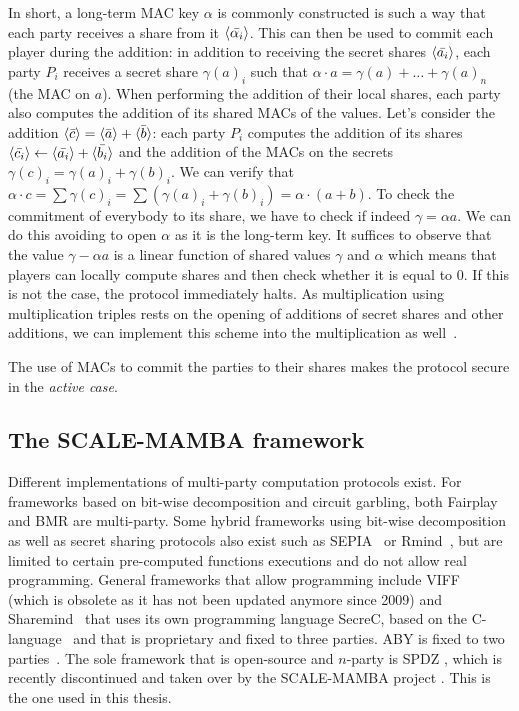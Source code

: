 In short, a long-term MAC key $\alpha$ is commonly constructed is such a way that each party receives a share from it $\langle \bar{\alpha_i} \rangle$. This can then be used to commit each player during the addition: in addition to receiving the secret shares $\langle \bar{a_i} \rangle$, each party $P_i$ receives a secret share $\gamma(a)_i$ such that $\alpha \cdot a = \gamma(a) + \ldots + \gamma(a)_n$ (the MAC on $a$). When performing the addition of their local shares, each party also computes the addition of its shared MACs of the values. Let's consider the addition $\langle \bar{c} \rangle = \langle \bar{a} \rangle + \langle \bar{b} \rangle$: each party $P_i$ computes the addition of its shares $\langle \bar{c_i} \rangle \leftarrow \langle \bar{a_i} \rangle + \langle \bar{b_i} \rangle$ and the addition of the MACs on the secrets $\gamma(c)_i = \gamma(a)_i + \gamma(b)_i$. We can verify that $\alpha \cdot c = \sum \gamma(c)_i = \sum(\gamma(a)_i + \gamma(b)_i) = \alpha \cdot (a + b)$. To check the commitment of everybody to its share, we have to check if indeed $\gamma= \alpha a$. We can do this avoiding to open $\alpha$ as it is the long-term key. It suffices to observe that the value $\gamma - \alpha a$ is a linear function of shared values $\gamma$ and $\alpha$ which means that players can locally compute shares and then check whether it is equal to 0. If this is not the case, the protocol immediately halts. As multiplication using multiplication triples rests on the opening of additions of secret shares and other additions, we can implement this scheme into the multiplication as well~\cite{Damgard2012PracticalLimits.}.

The use of MACs to commit the parties to their shares makes the protocol secure in the \emph{active case}.

\subsection{The SCALE-MAMBA framework}
Different implementations of multi-party computation protocols exist. For frameworks based on bit-wise decomposition and circuit garbling, both Fairplay \cite{Malkhi2004FairplaySystem} and BMR \cite{Beaver1990TheProtocols} are multi-party. Some hybrid frameworks using bit-wise decomposition as well as secret sharing protocols also exist such as SEPIA~\cite{Burkhart2010SEPIA:Statistics} or Rmind~\cite{Bogdanov2018Rmind:Analysis}, but are limited to certain pre-computed functions executions and do not allow real programming. General frameworks that allow programming include VIFF~\cite{Damgard2009AsynchronousImplementation} (which is obsolete as it has not been updated anymore since 2009) and Sharemind~\cite{Bogdanov2008Sharemind:Computations,Bogdanov2013Sharemind:Applications} that uses its own programming language SecreC, based on the C-language~\cite{Ristioja2010AnLanguage,Jagomagis2010SecreCMining,Bogdanov2014Domain-PolymorphicOf} and that is proprietary and fixed to three parties. ABY is fixed to two parties~\cite{Demmler2015ABYComputation}. The sole framework that is open-source and $n$-party is SPDZ \cite{Damgard2012MultipartyEncryption,Damgard2012PracticalLimits.}, which is recently discontinued and taken over by the SCALE-MAMBA project \cite{Aly2018SCALEDocumentation}. This is the one used in this thesis.

